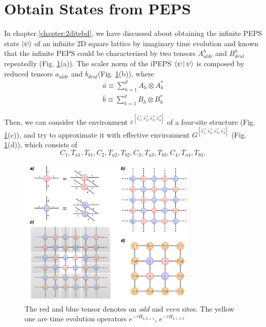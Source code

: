 \section{Obtain States from PEPS}
\label{2ditebdctm}
In chapter.\ref{chapter:2ditebd}, we have discussed about obtaining the infinite PEPS state $\Ket{\psi}$ of an infinite 2D square lattice by imaginary time evolution and known that the infinite PEPS could be characterized by two tensors $A^h_{uldr}$ and $B^h_{drul}$ repeatedly (Fig. \ref{fig511}(a)). The scaler norm of the iPEPS $\Braket{\psi|\psi}$ is composed by reduced tensors $a_{\bar{u}\bar{l}\bar{d}\bar{r}}$ and $b_{\bar{d}\bar{r}\bar{u}\bar{l}}$(Fig. \ref{fig511}(b)), where
\begin{align}
	\label{reduce_a}
	\bar{a} \equiv \sum_{h=1}^{d} A_{h} \otimes A^{*}_{h} \\
	\bar{b} \equiv \sum_{h=1}^{d} B_{h} \otimes B^{*}_{h}
\end{align}

Then, we can consider the environment $\varepsilon^{\left[\vec{r_1},\vec{r_2},\vec{r_3},\vec{r_4}\right]}$ of a four-site structure (Fig. \ref{fig511}(c)), and try to approximate it with effective environment $G^{\left[\vec{r_1},\vec{r_2},\vec{r_3},\vec{r_4}\right]}$ (Fig. \ref{fig511}(d)), which consists of $$C_1, T_{a1}, T_{b1},C_2, T_{a2}, T_{b2},C_3, T_{a3}, T_{b3},C_4, T_{a4}, T_{b4},$$
\begin{figure}[ht]
	\centering
	\includegraphics[width=0.75\textwidth]{figures/fig511.png}
	\caption[The picture of the main idea of itebd.]{The red and blue tensor denotes on \textit{odd} and \textit{even} sites. The yellow one are time evolution operators $e^{-\tau H_{k,k+1}}$, $e^{-\tau H_{k+1,k}}$}
	\label{fig511}
\end{figure}

